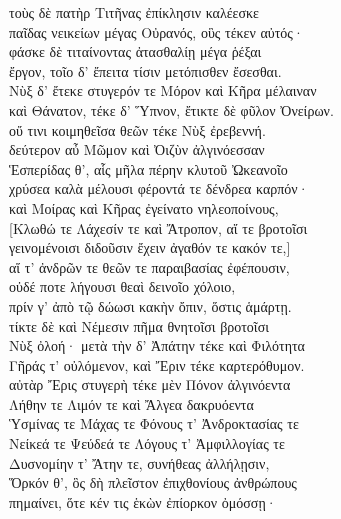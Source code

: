\begin{pages}
\begin{Leftside}
\quad{}τοὺς δὲ πατὴρ Τιτῆνας ἐπίκλησιν καλέεσκε\\
παῖδας νεικείων μέγας Οὐρανός, οὓς τέκεν αὐτός· \\
φάσκε δὲ τιταίνοντας ἀτασθαλίῃ μέγα ῥέξαι\\
ἔργον, τοῖο δ' ἔπειτα τίσιν μετόπισθεν ἔσεσθαι. \\

\quad{}Νὺξ δ' ἔτεκε στυγερόν τε Μόρον καὶ Κῆρα μέλαιναν \\
καὶ Θάνατον, τέκε δ' Ὕπνον, ἔτικτε δὲ φῦλον Ὀνείρων. \\
οὔ τινι κοιμηθεῖσα θεῶν τέκε Νὺξ ἐρεβεννή. \\
δεύτερον αὖ Μῶμον καὶ Ὀιζὺν ἀλγινόεσσαν\\
Ἑσπερίδας θ', αἷς μῆλα πέρην κλυτοῦ Ὠκεανοῖο  \\
χρύσεα καλὰ μέλουσι φέροντά τε δένδρεα καρπόν·\\
καὶ Μοίρας καὶ Κῆρας ἐγείνατο νηλεοποίνους,\\
{[}Κλωθώ τε Λάχεσίν τε καὶ Ἄτροπον, αἵ τε βροτοῖσι \\
γεινομένοισι διδοῦσιν ἔχειν ἀγαθόν τε κακόν τε,{]} \\
αἵ τ' ἀνδρῶν τε θεῶν τε παραιβασίας ἐφέπουσιν,  \\
οὐδέ ποτε λήγουσι θεαὶ δεινοῖο χόλοιο,\\
πρίν γ' ἀπὸ τῷ δώωσι κακὴν ὄπιν, ὅστις ἁμάρτῃ.\\
τίκτε δὲ καὶ Νέμεσιν πῆμα θνητοῖσι βροτοῖσι \\
Νὺξ ὀλοή· μετὰ τὴν δ' Ἀπάτην τέκε καὶ Φιλότητα \\
Γῆράς τ' οὐλόμενον, καὶ Ἔριν τέκε καρτερόθυμον. \\

\quad{}αὐτὰρ Ἔρις στυγερὴ τέκε μὲν Πόνον ἀλγινόεντα\\
Λήθην τε Λιμόν τε καὶ Ἄλγεα δακρυόεντα\\
Ὑσμίνας τε Μάχας τε Φόνους τ' Ἀνδροκτασίας τε\\
Νείκεά τε Ψεύδεά τε Λόγους τ' Ἀμφιλλογίας τε \\
Δυσνομίην τ' Ἄτην τε, συνήθεας ἀλλήλῃσιν, \\
Ὅρκόν θ', ὃς δὴ πλεῖστον ἐπιχθονίους ἀνθρώπους\\
πημαίνει, ὅτε κέν τις ἑκὼν ἐπίορκον ὀμόσσῃ· \\

\smallskip
\begin{center}\end{center}
\smallskip


\end{Leftside}
\end{pages}
